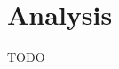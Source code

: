 \documentclass[12pt,twoside,abbrevs,msc,ai,notimes,logo,sansheadings]{infthesis}
\begin{document}
  \section{Analysis}
  TODO
  
   
  
  
  
  

  \appendix


  {}
  
\end{document}
